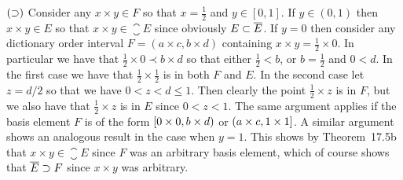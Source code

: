 {{    $(\supset)$ Consider any $x \times y \in F$ so that $x = \tfrac{1}{2}$ and $y \in [0,1]$.
    If $y \in (0,1)$ then $x \times y \in E$ so that $x \times y \in \closure{E}$ since obviously $E \subset \overline{E}$.
    If $y = 0$ then consider any dictionary order interval $F = (a \times c, b \times d)$ containing $x \times y = \tfrac{1}{2} \times 0$.
    In particular we have that $\tfrac{1}{2} \times 0 \prec b \times d$ so that either $\tfrac{1}{2} < b$, or $b = \tfrac{1}{2}$ and $0 < d$.
    In the first case we have that $\tfrac{1}{2} \times \tfrac{1}{2}$ is in both $F$ and $E$.
    In the second case let $z = d/2$ so that we have $0 < z < d \leq 1$.
    Then clearly the point $\tfrac{1}{2} \times z$ is in $F$, but we also have that $\tfrac{1}{2} \times z$ is in $E$ since $0 < z < 1$.
    The same argument applies if the basis element $F$ is of the form $[0 \times 0, b \times d)$ or $(a \times c, 1 \times 1]$.
    A similar argument shows an analogous result in the case when $y = 1$.
    This shows by Theorem~17.5b that $x \times y \in \closure{E}$ since $F$ was an arbitrary basis element, which of course shows that $\overline{E} \supset F$ since $x \times y$ was arbitrary.
  }
}

